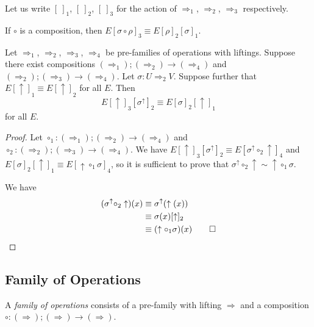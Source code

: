 \documentclass[envcountsame]{llncs}
\begin{document}

Let us write $[\ ]_1$, $[\ ]_2$, $[\ ]_3$ for the action of $\Rightarrow_1$, $\Rightarrow_2$, $\Rightarrow_3$ respectively.

\begin{lemma}
 If $\circ$ is a composition, then $E[\sigma \circ \rho]_3 \equiv E [ \rho ]_2 [ \sigma ]_1$.
\end{lemma}


\begin{lemma}
 Let $\Rightarrow_1$, $\Rightarrow_2$, $\Rightarrow_3$, $\Rightarrow_4$ be pre-families of operations with liftings.  Suppose there exist compositions
 $(\Rightarrow_1); (\Rightarrow_2) \rightarrow (\Rightarrow_4)$ and $(\Rightarrow_2); (\Rightarrow_3) \rightarrow (\Rightarrow_4)$.  Let $\sigma : U \Rightarrow_2 V$.
 Suppose further that $E[\uparrow]_1 \equiv E[\uparrow]_2$ for all $E$.  Then
 \[ E [\uparrow]_3 [\sigma^\uparrow]_2 \equiv E [\sigma]_2 [\uparrow]_1 \]
 for all $E$.
\end{lemma}


\begin{proof}
Let $\circ_1 : (\Rightarrow_1); (\Rightarrow_2) \rightarrow (\Rightarrow_4)$ and $\circ_2 : (\Rightarrow_2); (\Rightarrow_3) \rightarrow (\Rightarrow_4)$.
 We have $E[\uparrow]_3 [\sigma^\uparrow]_2 \equiv E [\sigma^\uparrow \circ_2 \uparrow]_4$ and $E [\sigma]_2 [\uparrow]_1 \equiv E [\uparrow \circ_1 \sigma]_4$,
 so it is sufficient to prove that $\sigma^\uparrow \circ_2 \uparrow \sim \uparrow \circ_1 \sigma$.
 
 We have
 \begin{align*}
  (\sigma^\uparrow \circ_2 \uparrow)(x) & \equiv \sigma^\uparrow(\uparrow(x)) \\
  & \equiv \sigma(x) [\uparrow]_2 \\
  & \equiv (\uparrow \circ_1 \sigma)(x) \qed
 \end{align*}
\end{proof}

\subsection{Family of Operations}

\begin{definition}
 A \emph{family of operations} consists of a pre-family with lifting $\Rightarrow$ and a composition $\circ : (\Rightarrow) ; (\Rightarrow) \rightarrow (\Rightarrow)$.
\end{definition}

\end{document}
